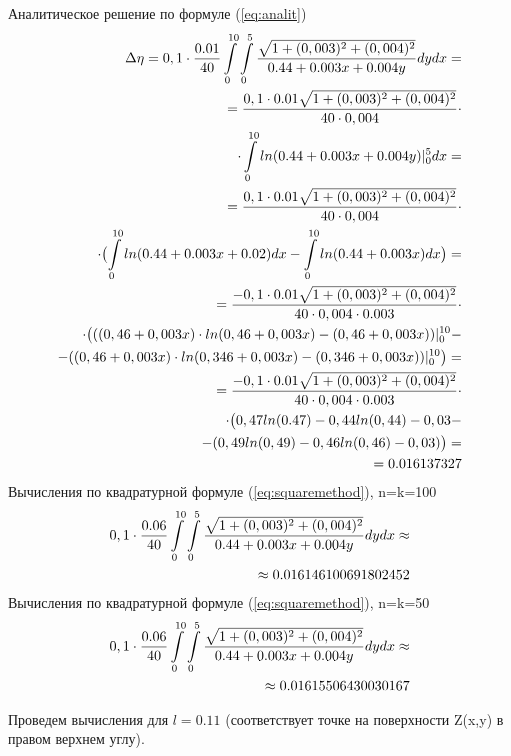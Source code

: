\documentclass{article}
\begin{document}
Аналитическое решение по формуле (\ref{eq:analit})
\begin{align} \label{eq:analit1:med}
\Delta \eta = 0,1 \cdot \frac{0.01}{40} \int\limits_0^{10} \int\limits_0^5 \frac{\sqrt{1+(0,003)^2+(0,004)^2}}{0.44 + 0.003x + 0.004y} dy dx = \notag \\
= \frac{0,1 \cdot 0.01\sqrt{1+(0,003)^2+(0,004)^2}}{40 \cdot 0,004} \cdot \notag \\
\cdot \int\limits_0^{10} ln(0.44 + 0.003x + 0.004y)|_0^5 dx = \notag \\
= \frac{0,1 \cdot 0.01\sqrt{1+(0,003)^2+(0,004)^2}}{40 \cdot 0,004} \cdot \notag \\
\cdot \bigl(\int\limits_0^{10} ln(0.44 + 0.003x + 0.02)dx - \int\limits_0^{10} ln(0.44 + 0.003x)dx \bigr) = \notag \\
= \frac{-0,1 \cdot 0.01\sqrt{1+(0,003)^2+(0,004)^2}}{40 \cdot 0,004 \cdot 0.003} \cdot \notag \\
\cdot \bigl(((0,46+0,003x) \cdot ln(0,46+0,003x) - (0,46+0,003x))|_0^{10} - \notag \\
- ((0,46+0,003x) \cdot ln(0,346+0,003x) - (0,346+0,003x))|_0^{10}\bigr) = \notag \\
= \frac{-0,1 \cdot 0.01\sqrt{1+(0,003)^2+(0,004)^2}}{40 \cdot 0,004 \cdot 0.003} \cdot \notag \\
\cdot \bigl(0,47 ln(0.47)-0,44ln(0,44)-0,03- \notag \\
- (0,49ln(0,49)-0,46ln(0,46)-0,03)\bigr) = \notag \\
= 0.016137327
\end{align}
Вычисления по квадратурной формуле (\ref{eq:squaremethod}), n=k=100
\begin{align}\label{eq:sq1med10}
0,1 \cdot \frac{0.06}{40} \int\limits_0^{10} \int\limits_0^5 \frac{\sqrt{1+(0,003)^2+(0,004)^2}}{0.44 + 0.003x + 0.004y} dy dx \approx \notag \\ \approx 0.016146100691802452
\end{align}
Вычисления по квадратурной формуле (\ref{eq:squaremethod}), n=k=50
\begin{align}\label{eq:sq1med5}
0,1 \cdot \frac{0.06}{40} \int\limits_0^{10} \int\limits_0^5 \frac{\sqrt{1+(0,003)^2+(0,004)^2}}{0.44 + 0.003x + 0.004y} dy dx \approx \notag \\ \approx 0.01615506430030167
\end{align}

Проведем вычисления для $l=0.11$ (соответствует точке на поверхности Z(x,y) в правом верхнем углу).
\end{document}
